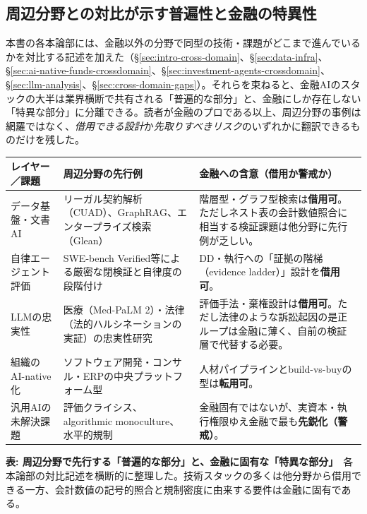 \subsection{周辺分野との対比が示す普遍性と金融の特異性}
\label{sec:cross-cutting-crossdomain}

本書の各本論部には、金融以外の分野で同型の技術・課題がどこまで進んでいるかを対比する記述を加えた（\S\ref{sec:intro-cross-domain}、\S\ref{sec:data-infra}、\S\ref{sec:ai-native-funds-crossdomain}、\S\ref{sec:investment-agents-crossdomain}、\S\ref{sec:llm-analysis}、\S\ref{sec:cross-domain-gaps}）。それらを束ねると、金融AIのスタックの大半は業界横断で共有される「普遍的な部分」と、金融にしか存在しない「特異な部分」に分離できる。読者が金融のプロである以上、周辺分野の事例は網羅ではなく、\emph{借用できる設計}か\emph{先取りすべきリスク}のいずれかに翻訳できるものだけを残した。

\begin{center}
\small
\begin{tabularx}{\textwidth}{@{}>{\raggedright\arraybackslash}p{3.0cm} >{\raggedright\arraybackslash}X >{\raggedright\arraybackslash}X@{}}
\toprule
\textbf{レイヤー／課題} & \textbf{周辺分野の先行例} & \textbf{金融への含意（借用か警戒か）} \\
\midrule
データ基盤・文書AI &
リーガル契約解析（CUAD\cite{y02cuad2021}）、GraphRAG\cite{y02graphrag2024}、エンタープライズ検索（Glean\cite{y02glean2025}） &
階層型・グラフ型検索は\textbf{借用可}。ただしネスト表の会計数値照合に相当する検証課題は他分野に先行例が乏しい。 \\
自律エージェント評価 &
SWE-bench Verified\cite{y04swebenchverified2024}等による厳密な閉検証と自律度の段階付け &
DD・執行への「証拠の階梯（evidence ladder）」設計を\textbf{借用可}。 \\
LLMの忠実性 &
医療（Med-PaLM 2\cite{y05medpalm2_2025}）・法律（法的ハルシネーションの実証\cite{y05dahl2024legalfictions}）の忠実性研究 &
評価手法・棄権設計は\textbf{借用可}。ただし法律のような訴訟起因の是正ループは金融に薄く、自前の検証層で代替する必要。 \\
組織のAI-native化 &
ソフトウェア開発・コンサル・ERPの中央プラットフォーム型\cite{y03mckinsey2026sevenoperatingtruths} &
人材パイプラインとbuild-vs-buyの型は\textbf{転用可}。 \\
汎用AIの未解決課題 &
評価クライシス、algorithmic monoculture\cite{y07monoculture2022}、水平的規制\cite{y07euaiacthorizontal} &
金融固有ではないが、実資本・執行権限ゆえ金融で最も\textbf{先鋭化（警戒）}。 \\
\bottomrule
\end{tabularx}
\end{center}
{\small\color{brandgray}\textbf{表: 周辺分野で先行する「普遍的な部分」と、金融に固有な「特異な部分」}\ 各本論部の対比記述を横断的に整理した。技術スタックの多くは他分野から借用できる一方、会計数値の記号的照合と規制密度に由来する要件は金融に固有である。}

